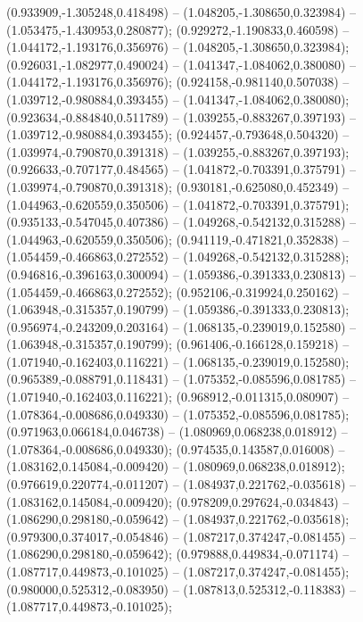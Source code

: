  (0.933909,-1.305248,0.418498) -- (1.048205,-1.308650,0.323984) -- (1.053475,-1.430953,0.280877);
 (0.929272,-1.190833,0.460598) -- (1.044172,-1.193176,0.356976) -- (1.048205,-1.308650,0.323984);
 (0.926031,-1.082977,0.490024) -- (1.041347,-1.084062,0.380080) -- (1.044172,-1.193176,0.356976);
 (0.924158,-0.981140,0.507038) -- (1.039712,-0.980884,0.393455) -- (1.041347,-1.084062,0.380080);
 (0.923634,-0.884840,0.511789) -- (1.039255,-0.883267,0.397193) -- (1.039712,-0.980884,0.393455);
 (0.924457,-0.793648,0.504320) -- (1.039974,-0.790870,0.391318) -- (1.039255,-0.883267,0.397193);
 (0.926633,-0.707177,0.484565) -- (1.041872,-0.703391,0.375791) -- (1.039974,-0.790870,0.391318);
 (0.930181,-0.625080,0.452349) -- (1.044963,-0.620559,0.350506) -- (1.041872,-0.703391,0.375791);
 (0.935133,-0.547045,0.407386) -- (1.049268,-0.542132,0.315288) -- (1.044963,-0.620559,0.350506);
 (0.941119,-0.471821,0.352838) -- (1.054459,-0.466863,0.272552) -- (1.049268,-0.542132,0.315288);
 (0.946816,-0.396163,0.300094) -- (1.059386,-0.391333,0.230813) -- (1.054459,-0.466863,0.272552);
 (0.952106,-0.319924,0.250162) -- (1.063948,-0.315357,0.190799) -- (1.059386,-0.391333,0.230813);
 (0.956974,-0.243209,0.203164) -- (1.068135,-0.239019,0.152580) -- (1.063948,-0.315357,0.190799);
 (0.961406,-0.166128,0.159218) -- (1.071940,-0.162403,0.116221) -- (1.068135,-0.239019,0.152580);
 (0.965389,-0.088791,0.118431) -- (1.075352,-0.085596,0.081785) -- (1.071940,-0.162403,0.116221);
 (0.968912,-0.011315,0.080907) -- (1.078364,-0.008686,0.049330) -- (1.075352,-0.085596,0.081785);
 (0.971963,0.066184,0.046738) -- (1.080969,0.068238,0.018912) -- (1.078364,-0.008686,0.049330);
 (0.974535,0.143587,0.016008) -- (1.083162,0.145084,-0.009420) -- (1.080969,0.068238,0.018912);
 (0.976619,0.220774,-0.011207) -- (1.084937,0.221762,-0.035618) -- (1.083162,0.145084,-0.009420);
 (0.978209,0.297624,-0.034843) -- (1.086290,0.298180,-0.059642) -- (1.084937,0.221762,-0.035618);
 (0.979300,0.374017,-0.054846) -- (1.087217,0.374247,-0.081455) -- (1.086290,0.298180,-0.059642);
 (0.979888,0.449834,-0.071174) -- (1.087717,0.449873,-0.101025) -- (1.087217,0.374247,-0.081455);
 (0.980000,0.525312,-0.083950) -- (1.087813,0.525312,-0.118383) -- (1.087717,0.449873,-0.101025);
